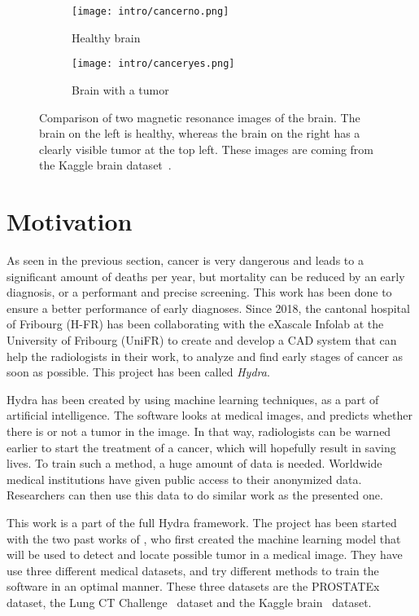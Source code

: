 \begin{figure}[t!]
  \centering
  \begin{subfigure}{0.49\textwidth}
     \centering
     \texttt{[image: intro/cancerno.png]}
     \caption{Healthy brain}
     \label{fig:cancerno}
  \end{subfigure}
  \hfill
  \begin{subfigure}{0.49\textwidth}
     \centering
     \texttt{[image: intro/canceryes.png]}
     \caption{Brain with a tumor}
     \label{fig:canceryes}
  \end{subfigure}
  \caption[Healthy brain with tumor brain comparison]{Comparison of two magnetic resonance images of the brain. The brain on the left is healthy, whereas the brain on the right has a clearly visible tumor at the top left. These images are coming from the Kaggle brain dataset~\cite{noauthor_brain_nodate}.}
  \label{fig:canceryesno}
\end{figure}


\section{Motivation}
As seen in the previous section, cancer is very dangerous and leads to a significant amount of deaths per year, but mortality can be reduced by an early diagnosis, or a performant and precise screening. This work has been done to ensure a better performance of early diagnoses. Since 2018, the cantonal hospital of Fribourg \mbox{(H-FR)} has been collaborating with the eXascale Infolab at the University of Fribourg (UniFR) to create and develop a CAD system that can help the radiologists in their work, to analyze and find early stages of cancer as soon as possible. This project has been called \emph{Hydra}.

Hydra has been created by using machine learning techniques, as a part of artificial intelligence. The software looks at medical images, and predicts whether there is or not a tumor in the image. In that way, radiologists can be warned earlier to start the treatment of a cancer, which will hopefully result in saving lives. To train such a method, a huge amount of data is needed. Worldwide medical institutions have given public access to their anonymized data. Researchers can then use this data to do similar work as the presented one.

This work is a part of the full Hydra framework. The project has been started with the two past works of \citet{clement_prostate_2020, lee_p-hydra_2020}, who first created the machine learning model that will be used to detect and locate possible tumor in a medical image. They have use three different medical datasets, and try different methods to train the software in an optimal manner. These three datasets are the PROSTATEx~\cite{armato_prostatex_2018} dataset, the Lung CT Challenge~\cite{kirby_lungx_2016} dataset and the Kaggle brain~\cite{noauthor_brain_nodate} dataset.

